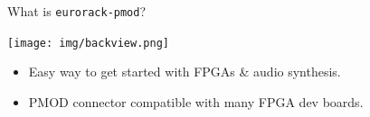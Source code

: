 \documentclass[aspectratio=169]{beamer}
\begin{document}



\begin{frame}{What is \texttt{eurorack-pmod}?}

    \begin{center}
        \texttt{[image: img/backview.png]}
    \end{center}

    \begin{itemize}
        \item Easy way to get started with FPGAs \& audio synthesis.
        \item PMOD connector compatible with many FPGA dev boards.
    \end{itemize}

\end{frame}
\end{document}
